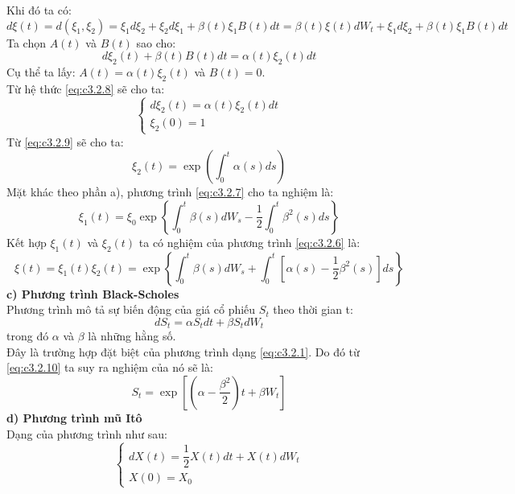 \documentclass[12pt,a4paper]{article}
\begin{document}
Khi đó ta có:
\begin{dmath*}
d\xi(t)=d(\xi_1,\xi_2)=\xi_1d\xi_2+\xi_2d\xi_1+\beta(t)\xi_1B(t)dt=\beta(t)\xi(t)dW_t+\xi_1d\xi_2+\beta(t)\xi_1B(t)dt	
\end{dmath*}
Ta chọn $A(t)$ và $B(t)$ sao cho:
\begin{equation*}
	d\xi_2(t)+\beta(t)B(t)dt=\alpha(t)\xi_2(t)dt
\end{equation*}
Cụ thể ta lấy: $A(t)=\alpha(t)\xi_2(t)$ và $B(t)=0$.\\
Từ hệ thức \eqref{eq:c3.2.8} sẽ cho ta:
\begin{equation}\label{eq:c3.2.9}
	\begin{cases}
		d\xi_2(t)=\alpha(t)\xi_2(t)dt\\
		\xi_2(0)=1
	\end{cases}
\end{equation}
Từ \eqref{eq:c3.2.9} sẽ cho ta:
\begin{equation*}
	\xi_2(t)=\exp\left(\int_{0}^{t}\alpha(s)ds \right)
\end{equation*}
Mặt khác theo phần a), phương trình \eqref{eq:c3.2.7} cho ta nghiệm là:
\begin{equation*}
	\xi_1(t)=\xi_0\exp\left\{\int_{0}^{t}\beta(s)dW_s-\dfrac{1}{2}\int_{0}^{t}\beta^2(s)ds \right\}
\end{equation*}
Kết hợp $\xi_1(t)$ và $\xi_2(t)$ ta có nghiệm của phương trình \eqref{eq:c3.2.6} là:
\begin{equation}\label{eq:c3.2.10}
	\xi(t)=\xi_1(t)\xi_2(t)=\exp\left\{\int_{0}^{t}\beta(s)dW_s+\int_{0}^{t}\left[\alpha(s)-\dfrac{1}{2}\beta^2(s) \right]ds\right\}
\end{equation}
\textbf{c) Phương trình Black-Scholes}\\
Phương trình mô tả sự biến động của giá cổ phiếu $S_t$ theo thời gian t:
\begin{equation}\label{eq:c3.2.11}
	dS_t=\alpha S_tdt+\beta S_tdW_t
\end{equation}
trong đó $\alpha$ và $\beta$ là những hằng số.\\
Đây là trường hợp đặt biệt của phương trình dạng \eqref{eq:c3.2.1}. Do đó từ \eqref{eq:c3.2.10} ta suy ra nghiệm của nó sẽ là:
\begin{equation}\label{eq:c3.2.12}
	S_t=\exp\left[\left(\alpha-\dfrac{\beta^2}{2} \right)t+\beta W_t \right]
\end{equation}
\textbf{d) Phương trình mũ Itô}\\
Dạng của phương trình như sau:
\begin{equation}\label{eq:c3.2.13}
	\begin{cases}
		dX(t)=\dfrac{1}{2}X(t)dt+X(t)dW_t\\
		X(0)=X_0
	\end{cases}
\end{equation}
\end{document}
